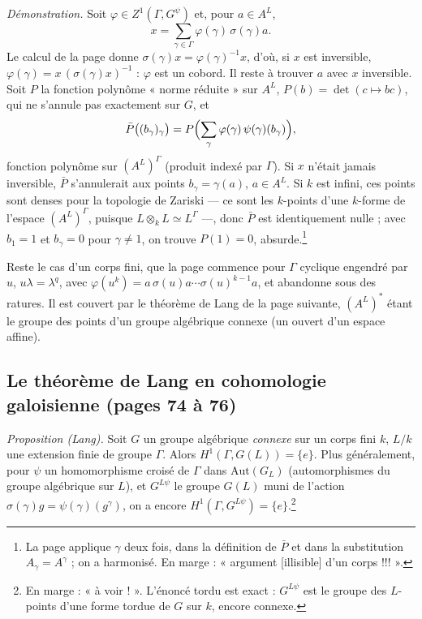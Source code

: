 \documentclass[11pt,a4paper]{article}
\begin{document}
\emph{Démonstration.} Soit $\varphi \in Z^1(\Gamma, G^{\psi})$ et, pour $a \in
A^{L}$,
\[
x = \sum_{\gamma \in \Gamma} \varphi(\gamma)\,\sigma(\gamma)a .
\]
Le calcul de la page donne $\sigma(\gamma)x = \varphi(\gamma)^{-1}x$, d'où, si
$x$ est inversible, $\varphi(\gamma) = x\,(\sigma(\gamma)x)^{-1}$ : $\varphi$ est
un cobord. Il reste à trouver $a$ avec $x$ inversible. Soit $P$ la fonction
polynôme « norme réduite » sur $A^{L}$, $P(b) = \det(c \mapsto bc)$, qui ne
s'annule pas exactement sur $G$, et
\[
\bar{P}\bigl((b_{\gamma})_{\gamma}\bigr) = P\Bigl(\sum_{\gamma} \varphi(\gamma)\,
\psi(\gamma)(b_{\gamma})\Bigr),
\]
fonction polynôme sur $(A^{L})^{\Gamma}$ (produit indexé par $\Gamma$). Si $x$
n'était jamais inversible, $\bar{P}$ s'annulerait aux points $b_{\gamma} =
\gamma(a)$, $a \in A^{L}$. Si $k$ est infini, ces points sont denses pour la
topologie de Zariski — ce sont les $k$-points d'une $k$-forme de l'espace
$(A^{L})^{\Gamma}$, puisque $L \otimes_k L \simeq L^{\Gamma}$ —, donc $\bar{P}$
est identiquement nulle ; avec $b_1 = 1$ et $b_{\gamma} = 0$ pour $\gamma \neq
1$, on trouve $P(1) = 0$, absurde.\footnote{La page applique $\gamma$ deux fois,
dans la définition de $\bar{P}$ et dans la substitution $A_{\gamma} =
A^{\gamma}$ ; on a harmonisé. En marge : « argument [illisible] d'un corps
!!! ».}

Reste le cas d'un corps fini, que la page commence pour $\Gamma$ cyclique
engendré par $u$, $u\lambda = \lambda^{q}$, avec $\varphi(u^{k}) = a\,\sigma(u)a
\cdots \sigma(u)^{k-1}a$, et abandonne sous des ratures. Il est couvert par le
théorème de Lang de la page suivante, $(A^{L})^{*}$ étant le groupe des points
d'un groupe algébrique connexe (un ouvert d'un espace affine).

\subsection*{Le théorème de Lang en cohomologie galoisienne (pages 74 à 76)}

\emph{Proposition (Lang).} Soit $G$ un groupe algébrique \emph{connexe} sur un
corps fini $k$, $L/k$ une extension finie de groupe $\Gamma$. Alors
$H^1(\Gamma, G(L)) = \lbrace e\rbrace$. Plus généralement, pour $\psi$ un
homomorphisme croisé de $\Gamma$ dans $\mathrm{Aut}(G_L)$ (automorphismes du
groupe algébrique sur $L$), et $G^{L\psi}$ le groupe $G(L)$ muni de l'action
$\sigma(\gamma)g = \psi(\gamma)(g^{\gamma})$, on a encore $H^1(\Gamma,
G^{L\psi}) = \lbrace e\rbrace$.\footnote{En marge : « à voir ! ». L'énoncé tordu
est exact : $G^{L\psi}$ est le groupe des $L$-points d'une forme tordue de $G$
sur $k$, encore connexe.}
\end{document}
